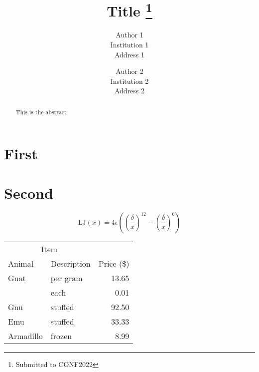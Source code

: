 \documentclass{nestpaper}
\title{Title%
  \footnote{Submitted to CONF2022}}
\author{
  Author 1\\
  Institution 1 \\
  Address 1 \\
  \email{author1@institution1.edu}
  \and
  Author 2\\
  Institution 2 \\
  Address 2 \\
  \email{author2@institution2.edu}}
\begin{document}
\maketitle

\begin{abstract}
    This is the abstract
\end{abstract}

\section{First}
\lipsum[1-8]

\section{Second}
\lipsum[9]
\begin{equation}
  \text{LJ}(x) = 4\epsilon\left(\left(\frac{\delta}{x}\right)^{12} - \left(\frac{\delta}{x}\right)^6\right)
\end{equation}

\lipsum[10]

\begin{table}[t]
  \centering
  \begin{tabular}{@{}llr@{}}
    \toprule
    \multicolumn{2}{c}{Item} \\
    \cmidrule(r){1-2}
    Animal    & Description & Price (\$)\\
    \midrule
    Gnat      & per gram    & 13.65     \\
              & each        & 0.01      \\
    Gnu       & stuffed     & 92.50     \\
    Emu       & stuffed     & 33.33     \\
    Armadillo & frozen      & 8.99      \\
    \bottomrule
  \end{tabular}
\end{table}
\end{document}
